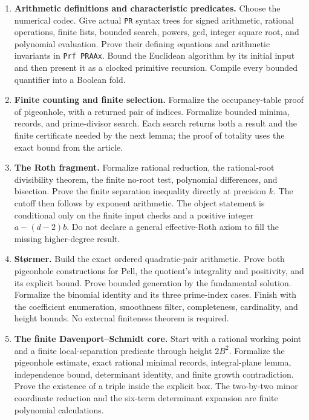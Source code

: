 \begin{enumerate}
\item \textbf{Arithmetic definitions and characteristic predicates.}
Choose the numerical codec.  Give actual \texttt{PR} syntax trees for signed
arithmetic, rational operations, finite lists, bounded search, powers, gcd,
integer square root, and polynomial evaluation.  Prove their defining
equations and arithmetic invariants in \texttt{Prf PRAAx}.  Bound the
Euclidean algorithm by its initial input and then present it as a clocked
primitive recursion.  Compile every bounded quantifier into a Boolean fold.

\item \textbf{Finite counting and finite selection.}
Formalize the occupancy-table proof of pigeonhole, with a returned pair of
indices.  Formalize bounded minima, records, and prime-divisor search.  Each
search returns both a result and the finite certificate needed by the next
lemma; the proof of totality uses the exact bound from the article.

\item \textbf{The Roth fragment.}
Formalize rational reduction, the rational-root divisibility theorem, the
finite no-root test, polynomial differences, and bisection.  Prove the finite
separation inequality directly at precision $k$.  The cutoff then follows
by exponent arithmetic.  The object statement is conditional only on the
finite input checks and a positive integer $a-(d-2)b$.  Do not declare a
general effective-Roth axiom to fill the missing higher-degree result.

\item \textbf{St\o rmer.}
Build the exact ordered quadratic-pair arithmetic.  Prove both pigeonhole
constructions for Pell, the quotient's integrality and positivity, and its
explicit bound.  Prove bounded generation by the fundamental solution.
Formalize the binomial identity and its three prime-index cases.  Finish
with the coefficient enumeration, smoothness filter, completeness, cardinality,
and height bounds.  No external finiteness theorem is required.

\item \textbf{The finite Davenport--Schmidt core.}
Start with a rational working point and a finite local-separation predicate
through height $2B^2$.  Formalize the pigeonhole estimate, exact rational
minimal records, integral-plane lemma, independence bound, determinant
identity, and finite growth contradiction.  Prove the existence of a triple
inside the explicit box.  The two-by-two minor coordinate reduction and
the six-term determinant expansion are finite polynomial calculations.


\end{enumerate}
